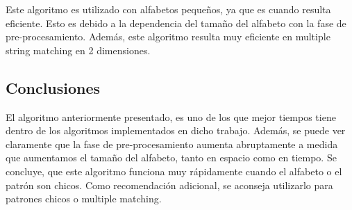 \documentclass[a4paper, 10pt]{article}
\begin{document}
		Este algoritmo es utilizado con alfabetos pequeños, ya que es cuando resulta eficiente. Esto es debido a la dependencia del tamaño del alfabeto con la fase de pre-procesamiento. Además, este algoritmo resulta muy eficiente en multiple string matching en 2 dimensiones.
		
		\subsection{Conclusiones}
		
		El algoritmo anteriormente presentado, es uno de los que mejor tiempos tiene dentro de los algoritmos implementados en dicho trabajo. Además, se puede ver claramente que la fase de pre-procesamiento aumenta abruptamente a medida que aumentamos el tamaño del alfabeto, tanto en espacio como en tiempo. Se concluye, que este algoritmo funciona muy rápidamente cuando el alfabeto o el patrón son chicos.
Como recomendación adicional, se aconseja utilizarlo para patrones chicos o multiple matching. 
		
\end{document}
